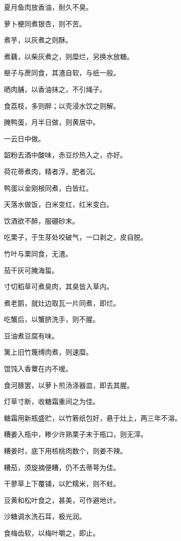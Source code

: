 \documentclass[a4paper,12pt,UTF8,twoside]{ctexbook}
\begin{document}
    夏月鱼肉放香油，耐久不臭。
    
    萝卜梗同煮银杏，则不苦。
    
    煮芋，以灰煮之则酥。
    
    煮藕，以柴灰煮之，则糜烂，另换水放糖。
    
    榧子与蔗同食，其渣自软，与纸一般。
    
    晒肉脯，以香油抹之，不引绳子。
    
    食荔枝，多则醉；以壳浸水饮之则解。
    
    腌鸭蛋，月半日做，则黄居中。
    
    一云日中做。
    
    韶粉去酒中酸味，赤豆炒热入之，亦好。
    
    荷花蒂煮肉，精者浮，肥者沉。
    
    鸭蛋以金刚根同煮，白皆红。
    
    天落水做饭，白米变红，红米变白。
    
    饮酒欲不醉，服硼砂末。
    
    吃栗子，于生芽处咬破气，一口剥之，皮自脱。
    
    竹叶与栗同食，无渣。
    
    茄干灰可腌海蜇。
    
    寸切稻草可煮臭肉，其臭皆入草内。
    
    煮老鹅，就灶边取瓦一片同煮，即烂。
    
    吃蟹后，以蟹脐洗手，则不腥。
    
    豆油煮豆腐有味。
    
    篱上旧竹篾缚肉煮，则速糜。
    
    馄饨入香蕈在内不嗳。
    
    食河豚罢，以萝卜煎汤涤器皿，即去其腥。
    
    灯草寸断，收糖霜重间之为佳。
    
    糖霜用新瓶盛贮，以竹箬纸包好，悬于灶上，两三年不溶。
    
    糟姜入瓶中，糁少许熟栗子末于瓶口，则无滓。
    
    糟姜时，底下用核桃肉数个，则姜不辣。
    
    糟茄，须旋摘便糟，仍不去蒂萼为佳。
    
    干蓼草上下覆铺，以贮糯米，则不蛀。
    
    豆黄和松叶食之，甚美，可作避地计。
    
    沙糖调水洗石耳，极光润。
    
    食梅齿软，以梅叶嚼之，即止。
    
\end{document}
